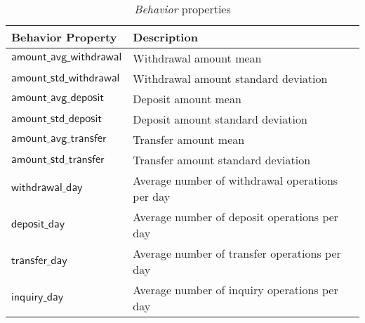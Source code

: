 \begin{table}[H]
    \centering
    \begin{tabular}{|l|l|}
        \hline
        \textbf{Behavior Property} & \textbf{Description} \\ 
        \hline
        $\mathsf{amount\_avg\_withdrawal}$ & Withdrawal amount mean\\ 
        \hline
        $\mathsf{amount\_std\_withdrawal}$ & Withdrawal amount standard deviation \\ 
        \hline
        $\mathsf{amount\_avg\_deposit}$ & Deposit amount mean \\ 
        \hline
        $\mathsf{amount\_std\_deposit}$ & Deposit amount standard deviation\\ 
        \hline
        $\mathsf{amount\_avg\_transfer}$ & Transfer amount mean \\ 
        \hline
        $\mathsf{amount\_std\_transfer}$ & Transfer amount standard deviation \\ 
        \hline
        $\mathsf{withdrawal\_day}$ & Average number of withdrawal operations per day \\ 
        \hline
        $\mathsf{deposit\_day}$ & Average number of deposit operations per day \\ 
        \hline
        $\mathsf{transfer\_day}$ & Average number of transfer operations per day \\ 
        \hline
        $\mathsf{inquiry\_day}$ & Average number of inquiry operations per day \\ 
        \hline
    \end{tabular}
    \caption{\emph{Behavior} properties}
    \label{table:behavior-properties}
\end{table}
